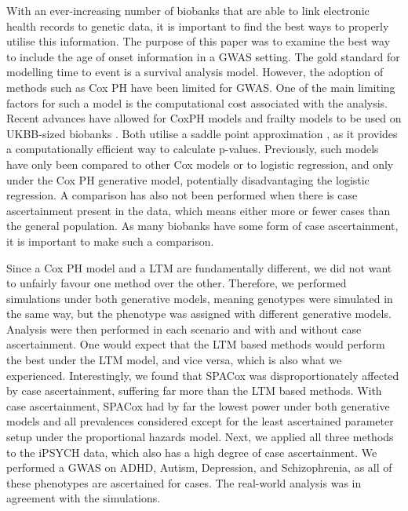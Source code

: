 
With an ever-increasing number of biobanks that are able to link electronic health records to genetic data, it is important to find the best ways to properly utilise this information. The purpose of this paper was to examine the best way to include the age of onset information in a GWAS setting. The gold standard for modelling time to event is a survival analysis model. However, the adoption of methods such as Cox PH have been limited for GWAS. One of the main limiting factors for such a model is the computational cost associated with the analysis. Recent advances have allowed for CoxPH models and frailty models to be used on UKBB-sized biobanks \cite{bi2020fast,dey2022efficient}. Both utilise a saddle point approximation \cite{daniels1954saddlepoint}, as it provides a computationally efficient way to calculate p-values. Previously, such models have only been compared to other Cox models or to logistic regression, and only under the Cox PH generative model, potentially disadvantaging the logistic regression. A comparison has also not been performed when there is case ascertainment present in the data, which means either more or fewer cases than the general population. As many biobanks have some form of case ascertainment, it is important to make such a comparison. 



Since a Cox PH model and a LTM are fundamentally different, we did not want to unfairly favour one method over the other. Therefore, we performed simulations under both generative models, meaning genotypes were simulated in the same way, but the phenotype was assigned with different generative models. Analysis were then performed in each scenario and with and without case ascertainment. One would expect that the LTM based methods would perform the best under the LTM model, and vice versa, which is also what we experienced. Interestingly, we found that SPACox was disproportionately affected by case ascertainment, suffering far more than the LTM based methods. With case ascertainment, SPACox had by far the lowest power under both generative models and all prevalences considered except for the least ascertained parameter setup under the proportional hazards model. Next, we applied all three methods to the iPSYCH data, which also has a high degree of case ascertainment. We performed a GWAS on ADHD, Autism, Depression, and Schizophrenia, as all of these phenotypes are ascertained for cases. The real-world analysis was in agreement with the simulations. 

